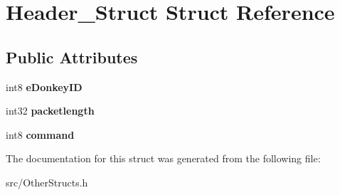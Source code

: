 \section{Header\_\-Struct Struct Reference}
\label{structHeader__Struct}
\subsection*{Public Attributes}
\begin{DoxyCompactItemize}
\item 
int8 {\bfseries eDonkeyID}\label{structHeader__Struct_ad06988b9de026c84116109a71520d217}

\item 
int32 {\bfseries packetlength}\label{structHeader__Struct_ae072c6eff956196904d2924af2cd853c}

\item 
int8 {\bfseries command}\label{structHeader__Struct_a4d54ecd50f8304a27f12d9d609d7c73b}

\end{DoxyCompactItemize}


The documentation for this struct was generated from the following file:\begin{DoxyCompactItemize}
\item 
src/OtherStructs.h\end{DoxyCompactItemize}

